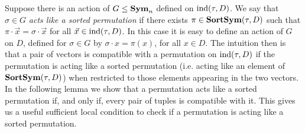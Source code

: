 \documentclass[../paper.tex]{subfiles}
\begin{document}
Suppose there is an action of $G \leq \text{\textbf{Sym}}_n$ defined on $\text{\upshape ind}(\tau, D)$. We say
that $\sigma \in G$ \emph{acts like a sorted permutation} if there exists $\pi
\in \text{\textbf{SortSym}}(\tau, D)$ such that $\pi \cdot \vec{x} = \sigma \cdot \vec{x}$ for
all $\vec{x} \in \text{\upshape ind}(\tau, D)$. In this case it is easy to define an action of $G$ on $D$, defined for $\sigma \in G$ by $\sigma \cdot x = \pi (x)$, for all $x \in D$. The intuition then is that a pair of vectors is
compatible with a permutation on $\text{\upshape ind}(\tau, D)$ if the permutation is acting like a sorted permutation (i.e. acting like an element of $\text{\textbf{SortSym}}(\tau, D)$) when restricted to those elements appearing in the two vectors. In the following lemma we
show that a permutation acts like a sorted permutation if, and only
if, every pair of tuples is compatible with it. This gives us a useful
sufficient local condition to check if a permutation is acting like a sorted permutation.
%






\end{document}
